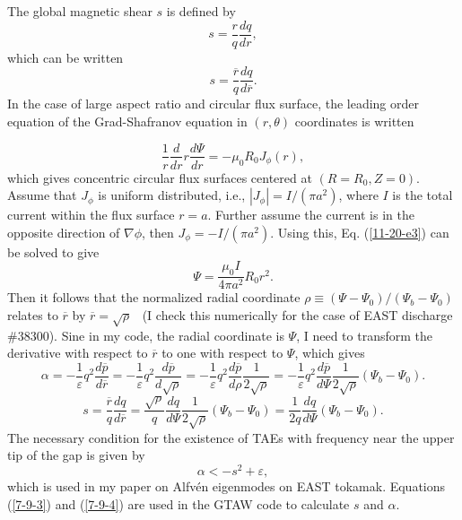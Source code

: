 \documentclass{llncs}
\begin{document}
The global magnetic shear $s$ is defined by
\begin{equation}
  s = \frac{r}{q}  \frac{d q}{d r},
\end{equation}
which can be written
\begin{equation}
  s = \frac{\overline{r}}{q}  \frac{d q}{d \overline{r}} .
\end{equation}
In the case of large aspect ratio and circular flux surface, the leading order
equation of the Grad-Shafranov equation in $(r, \theta)$ coordinates is
written


\begin{equation}
  \label{11-20-e3} \frac{1}{r}  \frac{d}{d r} r \frac{d \Psi}{d r} = - \mu_0
  R_0 J_{\phi} (r),
\end{equation}
which gives concentric circular flux surfaces centered at $(R = R_0, Z = 0)$.
Assume that $J_{\phi}$ is uniform distributed, i.e., $|J_{\phi} | = I / (\pi
a^2)$, where $I$ is the total current within the flux surface $r = a$. Further
assume the current is in the opposite direction of $\nabla \phi$, then
$J_{\phi} = - I / (\pi a^2)$. Using this, Eq. (\ref{11-20-e3}) can be solved
to give
\begin{equation}
  \label{11-21-4} \Psi = \frac{\mu_0 I}{4 \pi a^2} R_0 r^2 .
\end{equation}
Then it follows that the normalized radial coordinate $\rho \equiv (\Psi -
\Psi_0) / (\Psi_b - \Psi_0)$ relates to $\overline{r}$ by $\overline{r} =
\sqrt{\rho}$ \ (I check this numerically for the case of EAST discharge
\#38300). Sine in my code, the radial coordinate is $\Psi$, I need to
transform the derivative with respect to $\overline{r}$ to one with respect to
$\Psi$, which gives
\begin{equation}
  \label{7-9-3} \alpha = - \frac{1}{\varepsilon} q^2  \frac{d \overline{p}}{d
  \overline{r}} = - \frac{1}{\varepsilon} q^2  \frac{d \overline{p}}{d
  \sqrt{\rho}} = - \frac{1}{\varepsilon} q^2  \frac{d \overline{p}}{d \rho} 
  \frac{1}{2 \sqrt{\rho}} = - \frac{1}{\varepsilon} q^2  \frac{d
  \overline{p}}{d \Psi}  \frac{1}{2 \sqrt{\rho}} (\Psi_b - \Psi_0) .
\end{equation}
\begin{equation}
  \label{7-9-4} s = \frac{\overline{r}}{q}  \frac{d q}{d \overline{r}} =
  \frac{\sqrt{\rho}}{q}  \frac{d q}{d \Psi}  \frac{1}{2 \sqrt{\rho}} (\Psi_b -
  \Psi_0) = \frac{1}{2 q}  \frac{d q}{d \Psi}  (\Psi_b - \Psi_0) .
\end{equation}
The necessary condition for the existence of TAEs with frequency near the
upper tip of the gap is given by{\cite{berk1995}}
\begin{equation}
  \alpha < - s^2 + \varepsilon,
\end{equation}
which is used in my paper on Alfv{\'e}n eigenmodes on EAST
tokamak{\cite{hu2014}}. Equations (\ref{7-9-3}) and (\ref{7-9-4}) are used in
the GTAW code to calculate $s$ and $\alpha$.
\end{document}
